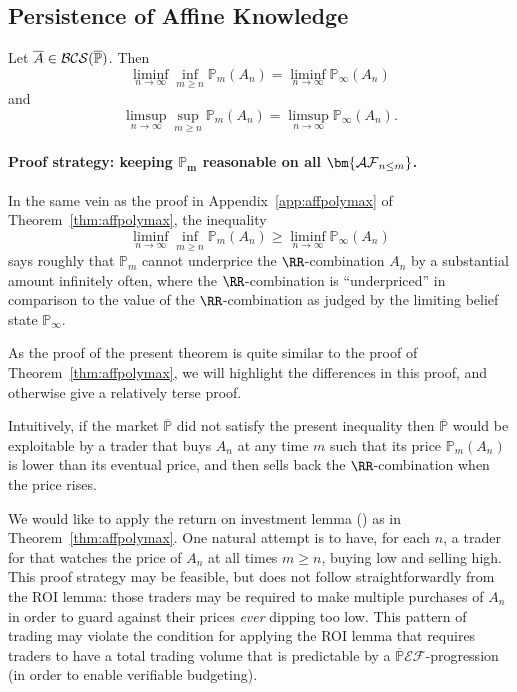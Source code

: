 \documentclass[authordate,onecolumn,noenvironments]{miri-tech-article}
\numberwithin{equation}{subsection}
\newcommand{\seq}[1]{{\overline{#1}}}
\newcommand{\mm}{m}
\newcommand{\nn}{n}
\newcommand{\pgenable}{\ensuremath{\MP}\text{-generable}\xspace}
\newcommand{\afffeat}{\mathcal{A\-F}}
\newcommand{\exfeatures}{\mathcal{E\!F}} %
\newcommand{\aff}{A}
\newcommand{\BCS}[1][\MP]{\mathcal{B\-C\-S}(#1)} %
\newcommand{\BelState}{\mathbb{P}}
\newcommand{\pt}{\BelState}
\newcommand{\MP}{\seq{\pt}}
\begin{document}



\subsection{Persistence of Affine Knowledge}\label{app:peraffkno}

Let $\seq{\aff}\in\BCS$. Then
\[
\liminf_{\nn\rightarrow\infty}\inf_{\mm\geq \nn}\pt_\mm(\aff_\nn)= \liminf_{\nn\to\infty}\pt_\infty(\aff_\nn)
\]
and
\[
\limsup_{\nn\rightarrow\infty}\sup_{\mm\geq \nn}\pt_\mm(\aff_\nn)=\limsup_{\nn\to\infty}\pt_\infty(\aff_\nn).
\]
%
\paragraph{Proof strategy: keeping $\bm{\pt_m}$ reasonable on all $\bm{\afffeat_{n \le m}}$.}

In the same vein as the proof in Appendix~\ref{app:affpolymax} of Theorem~\ref{thm:affpolymax}, the  inequality  
%
\[
\liminf_{\nn\rightarrow\infty}\inf_{\mm\geq \nn}\pt_\mm(\aff_\nn) \ge  \liminf_{\nn\to\infty}\pt_\infty(\aff_\nn)
\]
%
 says roughly that $\pt_m$ cannot underprice
   the $\RR$-combination $\aff_{n}$ by a substantial amount infinitely often, where the $\RR$-combination is
   ``underpriced'' in comparison to the value of the $\RR$-combination as judged by the limiting belief state $\pt_\infty$.  

As the proof of the present theorem is quite 
   similar to the proof of Theorem~\ref{thm:affpolymax}, we will highlight the differences in this proof, and otherwise give
  a relatively terse proof. 

Intuitively, if the market $\MP$ did not satisfy the present inequality then $\MP$ would be exploitable by a trader that buys $\aff_{n}$ at
any time $m$ such that its price $\pt_{m}(\aff_n)$ is lower than its eventual price, and then sells back the $\RR$-combination when the price rises.

We would like to apply the  
return on investment lemma () as in Theorem~\ref{thm:affpolymax}. One natural attempt is to have, for each $n$,
a trader for that watches
the price of $\aff_n$ at all times $m \ge n$, buying low and selling high. This proof strategy may be feasible, but does not follow 
straightforwardly from the ROI lemma: those traders may be required to make multiple purchases
of $\aff_n$ in order to guard against their prices \emph{ever} dipping too low. This pattern of trading may violate the condition for applying
the ROI lemma that requires traders to have a total trading volume  that is predictable by a \pgenable $\exfeatures$-progression (in order to enable verifiable budgeting). 
\end{document}
